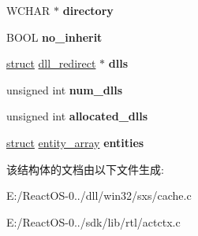 \begin{DoxyCompactItemize}
\mbox{\label{structassembly_a36b187e932257ccec2751a8f02dd876b}} 
W\+C\+H\+AR $\ast$ {\bfseries directory}
\item 
\mbox{\label{structassembly_a419a14f9ac0a1cb70e61479a9bd00481}} 
B\+O\+OL {\bfseries no\+\_\+inherit}
\item 
\mbox{\label{structassembly_a4c6084cbc7017462043c618d053852ed}} 
\hyperlink{interfacestruct}{struct} \hyperlink{structdll__redirect}{dll\+\_\+redirect} $\ast$ {\bfseries dlls}
\item 
\mbox{\label{structassembly_a721537494ea9af8b7475e6c783d8ea4f}} 
unsigned int {\bfseries num\+\_\+dlls}
\item 
\mbox{\label{structassembly_a4cae0dade82fb76723fe3855a3c4d53e}} 
unsigned int {\bfseries allocated\+\_\+dlls}
\item 
\mbox{\label{structassembly_a9bd4b3b60fabcfe133aebf5be85c1f4d}} 
\hyperlink{interfacestruct}{struct} \hyperlink{structentity__array}{entity\+\_\+array} {\bfseries entities}
\end{DoxyCompactItemize}


该结构体的文档由以下文件生成\+:\begin{DoxyCompactItemize}
\item 
E\+:/\+React\+O\+S-\/0../dll/win32/sxs/cache.\+c\item 
E\+:/\+React\+O\+S-\/0../sdk/lib/rtl/actctx.\+c\end{DoxyCompactItemize}
